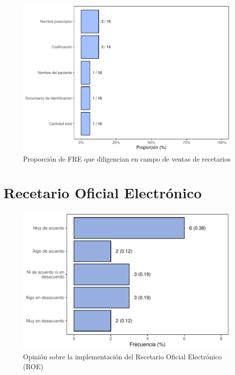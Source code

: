 \documentclass[
]{book}
\begin{document}
\begin{figure}
\includegraphics[width=0.85\linewidth]{InformeFinal_files/figure-latex/InformacionHerramiento-VentasRecetarios-1} \caption{Proporción de FRE que diligencian en campo de ventas de recetarios}\label{fig:InformacionHerramiento-VentasRecetarios}
\end{figure}

\hypertarget{recetario-oficial-electruxf3nico}{%
\section{Recetario Oficial Electrónico}\label{recetario-oficial-electruxf3nico}}

\begin{figure}
\includegraphics[width=0.85\linewidth]{InformeFinal_files/figure-latex/FREImplementacionROE-1} \caption{Opinión sobre la implementación del Recetario Oficial Electrónico (ROE)}\label{fig:FREImplementacionROE}
\end{figure}
\end{document}

